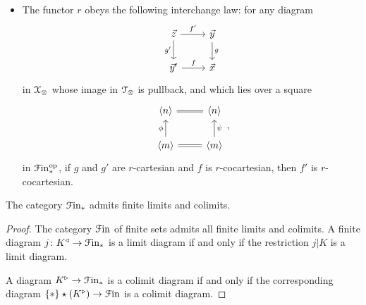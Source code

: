 \documentclass[main.tex]{subfiles}
\begin{document}
\begin{definition}
\begin{itemize}
    \item The functor $r$ obeys the following interchange law: for any diagram
      \begin{equation*}
        \begin{tikzcd}
          \vec{z}
          \arrow[r, "f'"]
          \arrow[d, swap, "g'"]
          & \vec{y}
          \arrow[d, "g"]
          \\
          \vec{y}'
          \arrow[r, "f"]
          & \vec{x}
        \end{tikzcd}
      \end{equation*}
      in $\mathcal{X}_{\otimes}$ whose image in $\mathcal{T}_{\otimes}$ is pullback, and which lies over a square
      \begin{equation*}
        \begin{tikzcd}
          \langle n \rangle
          & \langle n \rangle
          \arrow[l, equals]
          \\
          \langle m \rangle
          \arrow[u, "\phi"]
          & \langle m \rangle
          \arrow[l, equals]
          \arrow[u, swap, "\psi"]
        \end{tikzcd},
      \end{equation*}
      in $\mathcal{F}\mathrm{in}_{*}^{\mathrm{op}}$, if $g$ and $g'$ are $r$-cartesian and $f$ is $r$-cocartesian, then $f'$ is $r$-cocartesian.
  \end{itemize}
\end{definition}

\begin{lemma}
  The category $\mathcal{F}\mathrm{in}_{*}$ admits finite limits and colimits.
\end{lemma}
\begin{proof}
  The category $\mathcal{F}\mathrm{in}$ of finite sets admits all finite limits and colimits. A finite diagram $j\colon K^{\triangleleft} \to \mathcal{F}\mathrm{in}_{*}$ is a limit diagram if and only if the restriction $j|K$ is a limit diagram.

  A diagram $K^{\triangleright} \to \mathcal{F}\mathrm{in}_{*}$ is a colimit diagram if and only if the corresponding diagram $\{\ast\} \star (K^{\triangleright}) \to \mathcal{F}\mathrm{in}$ is a colimit diagram.
\end{proof}
\end{document}
